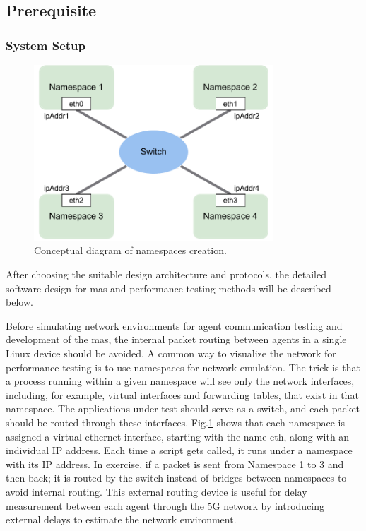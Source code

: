 \subsection{Prerequisite}
\subsubsection{System Setup}
 

\begin{figure}[htbp]
    \centering
\includegraphics[width=0.8\textwidth]{figures/NamespaceConceptual.pdf}
\caption{Conceptual diagram of namespaces creation.
\label{fig: NSConceptual}}
\end{figure}

After choosing the suitable design architecture and protocols, the detailed 
software design for \gls{mas} and performance testing methods will be described below. 

Before simulating network environments for agent communication testing 
and development of the \gls{mas}, the internal packet routing between agents 
in a single Linux device should be avoided. A common way to visualize 
the network for performance testing is to use namespaces for network 
emulation. The trick is that a process running within a given
namespace will see only the network interfaces, including, for example, 
virtual interfaces and forwarding tables, that exist in that namespace. 
The applications under test should serve as a
switch, and each packet should be routed through these interfaces. 
Fig.\ref{fig: NSConceptual} shows that each namespace is assigned 
a virtual ethernet interface, 
starting with the name eth, along with an individual IP address. 
Each time a script gets called, it runs under a namespace with its 
IP address. In exercise, if a packet is sent from
Namespace 1 to 3 and then back; it is routed by the switch instead of 
bridges between namespaces to avoid internal routing. This external routing 
device is useful for delay measurement between each agent through the 5G network 
by introducing external delays to estimate the network environment. 

